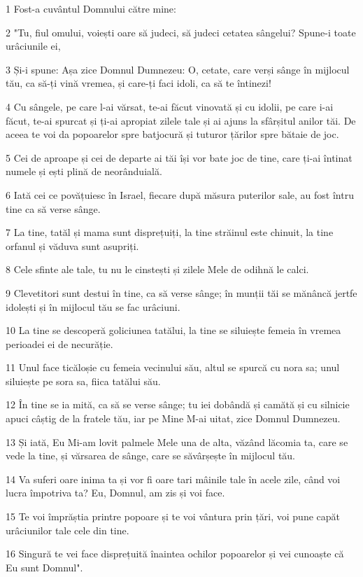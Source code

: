 \par 1 Fost-a cuvântul Domnului către mine:
\par 2 "Tu, fiul omului, voiești oare să judeci, să judeci cetatea sângelui? Spune-i toate urâciunile ei,
\par 3 Și-i spune: Așa zice Domnul Dumnezeu: O, cetate, care verși sânge în mijlocul tău, ca să-ți vină vremea, și care-ți faci idoli, ca să te întinezi!
\par 4 Cu sângele, pe care l-ai vărsat, te-ai făcut vinovată și cu idolii, pe care i-ai făcut, te-ai spurcat și ți-ai apropiat zilele tale și ai ajuns la sfârșitul anilor tăi. De aceea te voi da popoarelor spre batjocură și tuturor țărilor spre bătaie de joc.
\par 5 Cei de aproape și cei de departe ai tăi își vor bate joc de tine, care ți-ai întinat numele și ești plină de neorânduială.
\par 6 Iată cei ce povățuiesc în Israel, fiecare după măsura puterilor sale, au fost întru tine ca să verse sânge.
\par 7 La tine, tatăl și mama sunt disprețuiți, la tine străinul este chinuit, la tine orfanul și văduva sunt asupriți.
\par 8 Cele sfinte ale tale, tu nu le cinstești și zilele Mele de odihnă le calci.
\par 9 Clevetitori sunt destui în tine, ca să verse sânge; în munții tăi se mănâncă jertfe idolești și în mijlocul tău se fac urâciuni.
\par 10 La tine se descoperă goliciunea tatălui, la tine se siluiește femeia în vremea perioadei ei de necurăție.
\par 11 Unul face ticăloșie cu femeia vecinului său, altul se spurcă cu nora sa; unul siluiește pe sora sa, fiica tatălui său.
\par 12 În tine se ia mită, ca să se verse sânge; tu iei dobândă și camătă și cu silnicie apuci câștig de la fratele tău, iar pe Mine M-ai uitat, zice Domnul Dumnezeu.
\par 13 Și iată, Eu Mi-am lovit palmele Mele una de alta, văzând lăcomia ta, care se vede la tine, și vărsarea de sânge, care se săvârșește în mijlocul tău.
\par 14 Va suferi oare inima ta și vor fi oare tari mâinile tale în acele zile, când voi lucra împotriva ta? Eu, Domnul, am zis și voi face.
\par 15 Te voi împrăștia printre popoare și te voi vântura prin țări, voi pune capăt urâciunilor tale cele din tine.
\par 16 Singură te vei face disprețuită înaintea ochilor popoarelor și vei cunoaște că Eu sunt Domnul".
